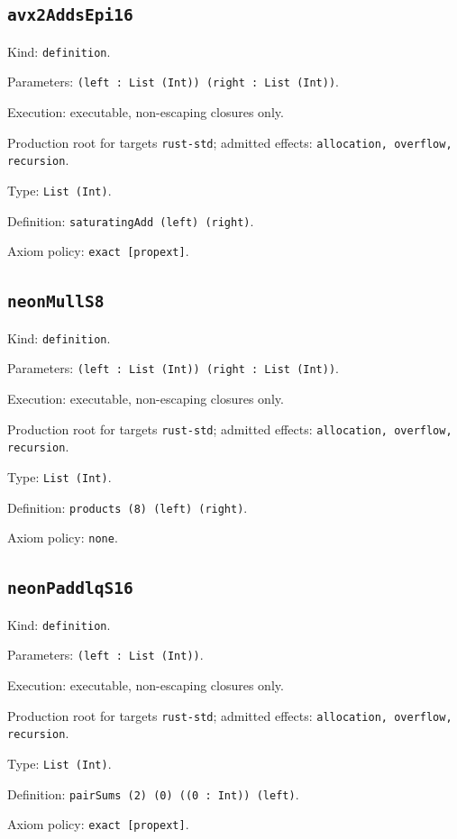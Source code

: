 \documentclass[11pt]{article}
\begin{document}
\subsection*{\texttt{avx2AddsEpi16}}
\noindent Kind: \texttt{definition}.\par
\noindent Parameters: \texttt{(left : List (Int)) (right : List (Int))}.\par
\noindent Execution: executable, non-escaping closures only.\par
\noindent Production root for targets \texttt{rust-std}; admitted effects: \texttt{allocation, overflow, recursion}.\par
\noindent Type: \texttt{List (Int)}.\par
\noindent Definition: \texttt{saturatingAdd (left) (right)}.\par
\noindent Axiom policy: \texttt{exact [propext]}.\par
\subsection*{\texttt{neonMullS8}}
\noindent Kind: \texttt{definition}.\par
\noindent Parameters: \texttt{(left : List (Int)) (right : List (Int))}.\par
\noindent Execution: executable, non-escaping closures only.\par
\noindent Production root for targets \texttt{rust-std}; admitted effects: \texttt{allocation, overflow, recursion}.\par
\noindent Type: \texttt{List (Int)}.\par
\noindent Definition: \texttt{products (8) (left) (right)}.\par
\noindent Axiom policy: \texttt{none}.\par
\subsection*{\texttt{neonPaddlqS16}}
\noindent Kind: \texttt{definition}.\par
\noindent Parameters: \texttt{(left : List (Int))}.\par
\noindent Execution: executable, non-escaping closures only.\par
\noindent Production root for targets \texttt{rust-std}; admitted effects: \texttt{allocation, overflow, recursion}.\par
\noindent Type: \texttt{List (Int)}.\par
\noindent Definition: \texttt{pairSums (2) (0) ((0 : Int)) (left)}.\par
\noindent Axiom policy: \texttt{exact [propext]}.\par
\end{document}
